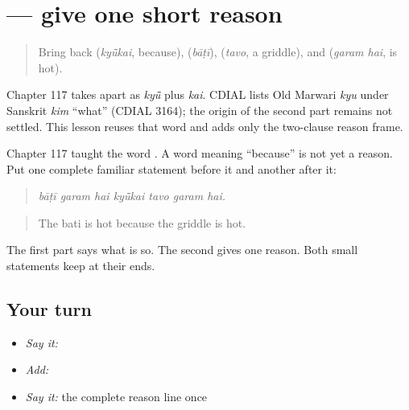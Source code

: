 \section[\texorpdfstring{\mw{बाटी} \mw{गरम} \mw{है} \mw{क्यूंकै} … (bāṭī garam hai …)}{बाटी गरम है क्यूंकै … (bāṭī garam hai …)}]{ — give one short reason}

\label{lesson:MW-C151-kyunkai-reason}



\begin{quote}
Bring back \textbf{} (\emph{kyū̃kai}, because), \textbf{} (\emph{bāṭī}), \textbf{} (\emph{tavo}, a griddle), and \textbf{ } (\emph{garam hai}, is hot).
\end{quote}

\begin{cousinweb}
Chapter 117 takes \textbf{} apart as \emph{kyū̃} plus \emph{kai}. CDIAL lists Old Marwari \emph{kyu} under Sanskrit \emph{kim} “what” (CDIAL 3164); the origin of the second part remains not settled. This lesson reuses that word and adds only the two-clause reason frame.
\end{cousinweb}

\begin{grammarlens}[title={What you've built}]
Chapter 117 taught the word \textbf{}. A word meaning “because” is not yet a reason. Put one complete familiar statement before it and another after it:

\begin{quote}
\textbf{      }
\end{quote}

\begin{quote}
\emph{bāṭī garam hai kyū̃kai tavo garam hai.}
\end{quote}

\begin{quote}
The bati is hot because the griddle is hot.
\end{quote}

The first part says what is so. The second gives one reason. Both small statements keep \textbf{} at their ends.
\end{grammarlens}

\subsection*{Your turn}
\begin{itemize}
\raggedright
  \item \emph{Say it:} \textbf{  }
  \item \emph{Add:} \textbf{   }
  \item \emph{Say it:} the complete reason line once
\end{itemize}

